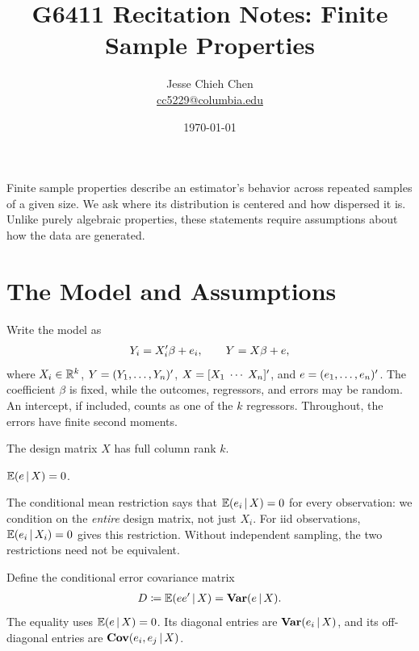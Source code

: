\documentclass[a4paper,12pt]{article}
\title{G6411 Recitation Notes: \glsentryshort{ols} Finite Sample Properties}
\author{Jesse Chieh Chen\\\href{mailto:cc5229@columbia.edu}{cc5229@columbia.edu}}
\date{\today}
\begin{document}
\maketitle

\noindent
Finite sample properties describe an estimator's behavior across repeated samples of a given size.
We ask where its distribution is centered and how dispersed it is.
Unlike purely algebraic properties, these statements require assumptions about how the data are generated.

\section{The Model and Assumptions}

Write the model as
\begin{align}\label{eq-model}
	Y_i=X_i^{\prime}\beta+e_i,
	\qquad Y=X\beta+e,
\end{align}
where $X_i\in\mathbb{R}^k$, $Y=(Y_1,\ldots,Y_n)^{\prime}$,
$X=[X_1\;\cdots\;X_n]^{\prime}$, and $e=(e_1,\ldots,e_n)^{\prime}$.
The coefficient $\beta$ is fixed, while the outcomes, regressors, and errors may be random.
An intercept, if included, counts as one of the $k$ regressors.
Throughout, the errors have finite second moments.

\begin{assumption}\label{ass-full-rank}
	The design matrix $X$ has full column rank $k$.
\end{assumption}

\begin{assumption}\label{ass-conditional-mean}
		$\operatorname{\mathbb{E}}(e\mathpunct{}|\mathpunct{} X)=0$.
\end{assumption}

\begin{remark}
	The conditional mean restriction says that $\operatorname{\mathbb{E}}(e_i\mathpunct{}|\mathpunct{} X)=0$ for every observation:
	we condition on the \emph{entire} design matrix, not just $X_i$.
	For \gls{iid} observations, $\operatorname{\mathbb{E}}(e_i\mathpunct{}|\mathpunct{} X_i)=0$ gives this restriction.
	Without independent sampling, the two restrictions need not be equivalent.
\end{remark}

Define the conditional error covariance matrix
\begin{align}\label{eq-error-covariance}
	D\coloneqq\operatorname{\mathbb{E}}(ee^{\prime}\mathpunct{}|\mathpunct{} X)=\operatorname{\text{\textrm{\upshape\textbf{Var}}}}(e\mathpunct{}|\mathpunct{} X).
\end{align}
The equality uses $\operatorname{\mathbb{E}}(e\mathpunct{}|\mathpunct{} X)=0$.
Its diagonal entries are $\operatorname{\text{\textrm{\upshape\textbf{Var}}}}(e_i\mathpunct{}|\mathpunct{} X)$, and its off-diagonal entries are $\operatorname{\text{\textrm{\upshape\textbf{Cov}}}}(e_i,e_j\mathpunct{}|\mathpunct{} X)$.
\end{document}
